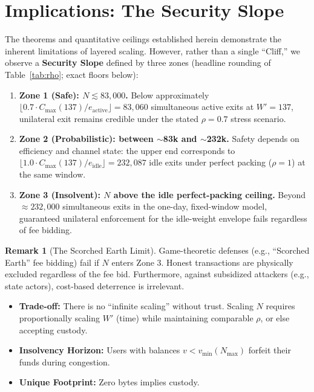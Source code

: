 \documentclass{article}
\theoremstyle{definition}
\newtheorem{remark}{Remark}
\begin{document}
\section{Implications: The Security Slope}
The theorems and quantitative ceilings established herein demonstrate the inherent limitations of layered scaling. However, rather than a single ``Cliff,'' we observe a \textbf{Security Slope} defined by three zones (headline rounding of Table~\ref{tab:rho}; exact floors below):

\begin{enumerate}
    \item \textbf{Zone 1 (Safe): $N \lesssim 83{,}000$.} Below approximately $\lfloor 0.7 \cdot C_{\max}(137) / e_{\mathrm{active}}\rfloor = 83{,}060$ simultaneous active exits at $W'=137$, unilateral exit remains credible under the stated $\rho=0.7$ stress scenario.
    \item \textbf{Zone 2 (Probabilistic): between $\sim$83k and $\sim$232k.} Safety depends on efficiency and channel state: the upper end corresponds to $\lfloor 1.0 \cdot C_{\max}(137) / e_{\mathrm{idle}}\rfloor = 232{,}087$ idle exits under perfect packing ($\rho=1$) at the same window.
    \item \textbf{Zone 3 (Insolvent): $N$ above the idle perfect-packing ceiling.} Beyond $\approx 232{,}000$ simultaneous exits in the one-day, fixed-window model, guaranteed unilateral enforcement for the idle-weight envelope fails regardless of fee bidding.
\end{enumerate}

\begin{remark}[The Scorched Earth Limit]
Game-theoretic defenses (e.g., ``Scorched Earth'' fee bidding) fail if $N$ enters Zone 3. Honest transactions are physically excluded regardless of the fee bid. Furthermore, against subsidized attackers (e.g., state actors), cost-based deterrence is irrelevant.
\end{remark}

\begin{itemize}
\item \textbf{Trade-off:} There is no ``infinite scaling'' without trust. Scaling $N$ requires proportionally scaling $W'$ (time) while maintaining comparable $\rho$, or else accepting custody.
\item \textbf{Insolvency Horizon:} Users with balances $v < v_{\min}(N_{\max})$ forfeit their funds during congestion.
\item \textbf{Unique Footprint:} Zero bytes implies custody.
\end{itemize}
\end{document}
